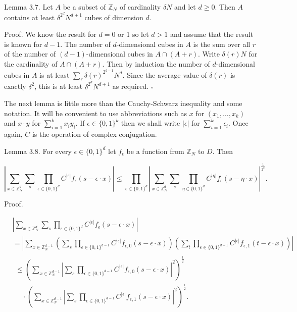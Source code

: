 \documentclass[10pt]{article}
\begin{document}
Lemma 3.7. Let $A$ be a subset of $\mathbb{Z}_{N}$ of cardinality $\delta N$ and let $d \geqslant 0$. Then $A$ contains at least $\delta^{2^{d}} N^{d+1}$ cubes of dimension $d$.

Proof. We know the result for $d=0$ or 1 so let $d>1$ and assume that the result is known for $d-1$. The number of $d$-dimensional cubes in $A$ is the sum over all $r$ of the number of $(d-1)$-dimensional cubes in $A \cap(A+r)$. Write $\delta(r) N$ for the cardinality of $A \cap(A+r)$. Then by induction the number of $d$-dimensional cubes in $A$ is at least $\sum_{r} \delta(r)^{2^{d-1}} N^{d}$. Since the average value of $\delta(r)$ is exactly $\delta^{2}$, this is at least $\delta^{2^{d}} N^{d+1}$ as required. \(\square\)

The next lemma is little more than the Cauchy-Schwarz inequality and some notation. It will be convenient to use abbreviations such as $x$ for $\left(x_{1}, \ldots, x_{k}\right)$ and $x \cdot y$ for $\sum_{i=1}^{k} x_{i} y_{i}$. If $\epsilon \in\{0,1\}^{k}$ then we shall write $|\epsilon|$ for $\sum_{i=1}^{k} \epsilon_{i}$. Once again, $C$ is the operation of complex conjugation.

Lemma 3.8. For every $\epsilon \in\{0,1\}^{d}$ let $f_{\epsilon}$ be a function from $\mathbb{Z}_{N}$ to $D$. Then

$$
\left|\sum_{x \in \mathbb{Z}_{N}^{d}} \sum_{s} \prod_{\epsilon \in\{0,1\}^{d}} C^{|\epsilon|} f_{\epsilon}(s-\epsilon \cdot x)\right| \leqslant \prod_{\epsilon \in\{0,1\}^{d}}\left|\sum_{x \in \mathbb{Z}_{N}^{d}} \sum_{s} \prod_{\eta \in\{0,1\}^{d}} C^{|\eta|} f_{\epsilon}(s-\eta \cdot x)\right|^{\frac{1}{2^{d}}} .
$$

Proof.

$$
\begin{aligned}
& \left|\sum_{x \in \mathbb{Z}_{N}^{d}} \sum_{s} \prod_{\epsilon \in\{0,1\}^{d}} C^{|\epsilon|} f_{\epsilon}(s-\epsilon \cdot x)\right| \\
& =\left|\sum_{x \in \mathbb{Z}_{N}^{d-1}}\left(\sum_{s} \prod_{\epsilon \in\{0,1\}^{d-1}} C^{|\epsilon|} f_{\epsilon, 0}(s-\epsilon \cdot x)\right)\left(\sum_{t} \prod_{\epsilon \in\{0,1\}^{d-1}} C^{|\epsilon|} f_{\epsilon, 1}(t-\epsilon \cdot x)\right)\right| \\
& \begin{array}{r}
\leqslant\left(\sum_{x \in \mathbb{Z}_{N}^{d-1}}\left|\sum_{s} \prod_{\epsilon \in\{0,1\}^{d-1}} C^{|\epsilon|} f_{\epsilon, 0}(s-\epsilon \cdot x)\right|^{2}\right)^{\frac{1}{2}} \\
\quad \cdot\left(\sum_{x \in \mathbb{Z}_{N}^{d-1}}\left|\sum_{s} \prod_{\epsilon \in\{0,1\}^{d-1}} C^{|\epsilon|} f_{\epsilon, 1}(s-\epsilon \cdot x)\right|^{2}\right)^{\frac{1}{2}} .
\end{array}
\end{aligned}
$$
\end{document}
